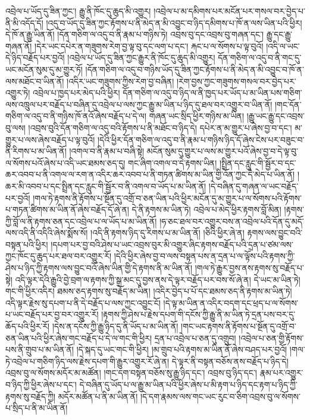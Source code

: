 འབྲེལ་པ་ཡོད་དུ་ཟིན་ཀྱང་། རྒྱུ་ནི་ཁོང་དུ་ཆུད་མི་འགྱུར། །འབྲེལ་པ་མ་དམིགས་པར་མངོན་པར་གསལ་བར་བྱེད་པ་ནི་མི་འདོད་དོ། །འདུ་བ་ཡོད་དུ་ཟིན་ཀྱང་རྟོགས་པ་ནི་མེད་ན་མི་འབྱུང་བ་ཉིད་དམིགས་པ་ཁོ་ན་ལས་ཡིན་པའི་ཕྱིར། དེ་ཁོ་ན་རྒྱུ་ཡིན་ནོ། །དོན་གཅིག་ལ་འདུ་བ་ནི་རྣམ་པ་གཉིས་ཏེ། འབྲས་བུ་དང་འབྲས་བུ་གཞན་དང་། རྒྱུ་དང་རྒྱུ་གཞན་ནོ། །དེར་ཡང་དཔེར་ན་གཟུགས་རེག་བྱ་ལྟ་བུ་དང་ལག་པ་དང་། རྐང་པ་ལ་སོགས་པ་ལྟ་བུའོ། །འདི་ལ་ཡང་དེ་ཉིད་བརྗོད་པར་བྱའོ། །འབྲེལ་པ་ཡོད་དུ་ཟིན་ཀྱང་རྒྱུར་ནི་ཁོང་དུ་ཆུད་མི་འགྱུར། དོན་གཅིག་ལ་འདུ་བ་ནི་གང་དུ་ཡང་མངོན་སུམ་དུ་མ་གྱུར་ཏོ། །དོན་གཅིག་ལ་འདུ་བ་གཉིས་ཡོད་དུ་ཟིན་ཀྱང་རྟོགས་པ་ནི་མེད་ན་མི་འབྱུང་བ་ཁོ་ན་ལས་མཐོང་བ་ཡིན་ནོ། །འདིར་ཡང་གཟུགས་ཀྱིས་རེག་བྱ་བཞིན། །རེག་བྱས་ཀྱང་གཟུགས་གསལ་བར་བྱེད་པར་འགྱུར་ཏེ། འབྲེལ་པ་ཁྱད་པར་མེད་པའི་ཕྱིར། དོན་གཅིག་ལ་འདུ་བ་ཉིད་ལ་ནི་ཁྱད་པར་ཡོད་པ་མ་ཡིན་པས་གཅིག་ལས་འཁྲུལ་པར་བརྗོད་པ་བཞིན་དུ་འབྲེལ་པ་ལས་ཀྱང་རྒྱུ་མ་ཡིན་པ་ཉིད་དུ་ཐལ་བར་འགྱུར་བ་ཡིན་ནོ། །གང་དོན་གཅིག་ལ་འདུ་བ་ནི་གཉིས་ཁོ་ནའོ་ཞེས་བརྗོད་པ་དེ་ལ། གཞན་ཡང་སྲིད་ཕྱིར་གཉིས་མ་ཡིན། །རྒྱུ་ཡང་རྒྱུ་དང་འབྲས་བུ་ལས། །འབྲས་བུའི་དོན་གཅིག་ལ་འདུ་བའི་རྟོགས་པ་ནི་མཐོང་བ་ཉིད་དེ། དཔེར་ན་མ་གྱུར་པ་ཞེས་བྱ་བ་དང་། མ་གྱུར་པ་ལས་ཞེས་བརྗོད་པ་ལྟ་བུའོ། །དེའི་ཕྱིར་དོན་གཅིག་ལ་འདུ་བ་ནི་རྣམ་པ་གཉིས་ཉིད་དོ་ཞེས་ངེས་པར་བཟུང་བ་ནི་རིགས་པ་མ་ཡིན་ནོ། །འགལ་བ་ནི་རྣམ་པ་བཞི་སྟེ། མངོན་སུམ་དུ་གྱུར་པ་ལས་མ་གྱུར་པའོ་ཞེས་བྱ་བ་དེ་ལྟ་བུ་ལ་སོགས་པའོ་ཞེས་པ་འདི་ཡང་ཐམས་ཅད་དུ། གང་ཞིག་འགལ་བ་དེ་རྟགས་ཡིན། །སྤྲིན་དང་རླུང་གི་སྦྱོར་བ་དང་ཆར་འབབ་པ་ནི་འགལ་ལ་རག་ན་འདིར་ཆར་འབབ་པ་ནི་གཏན་ཚིགས་མ་ཡིན་གྱི་འོན་ཀྱང་དེ་མེད་པ་ཡིན་ནོ། །ཆར་མི་འབབ་པ་དང་སྤྲིན་དང་རླུང་གི་སྦྱོར་བ་ནི་འགལ་བ་ཡོད་པ་མ་ཡིན་ནོ། །དེ་བཞིན་དུ་གཞན་ལ་ཡང་བརྗོད་པར་བྱའོ། །གལ་ཏེ་རྟགས་ནི་རྟོགས་པ་སྔོན་དུ་འགྲོ་བ་ཅན་ཡིན་པའི་ཕྱིར་མངོན་དུ་མ་གྱུར་པ་ལ་སོགས་པའི་རྟོགས་པ་གཏན་ཚིགས་མ་ཡིན་ནོ་ཞེས་བརྗོད་དོ་ཞེ་ན། དེ་ནི་རྟགས་མ་ཡིན་ཏེ། འབྲེལ་པ་མེད་ཕྱིར་རྟགས་བློ་མིན། །རྟགས་ཀྱི་བློ་ལ་ནི་རྟགས་ཅན་དང་འབྲེལ་པ་ལ་ཡོད་པ་མ་ཡིན་ནོ། །ཧ་ཅང་ཐལ་བར་འགྱུར་བས་ན་འབྲེལ་པའི་དོན་དུ་མདོ་ལས་འདི་ནི་འདིའི་ཞེས་སྨོས་སོ། །འདི་ནི་རྟགས་ཉིད་དུ་རིགས་པ་མ་ཡིན་ནོ། །ཅིའི་ཕྱིར་ཞེ་ན། རྟགས་ལས་བྱུང་བའི་བསྟན་པའི་ཕྱིར། །དཔག་པར་བྱ་བའི་ཤེས་པ་ཡང་འབྲས་བུར་མི་འགྱུར་ཞིང་རྟགས་བརྗོད་པའི་དྲན་པ་ཙམ་ལས་ཀྱང་ཁོང་དུ་ཆུད་པར་ཐལ་བར་འགྱུར་རོ། །དེའི་ཕྱིར་ཞེས་བྱ་བ་ལས་བསྟན་པས་ན་དྲན་པ་ལ་ལྟོས་པའི་རྟགས་ཀྱི་ཤེས་པ་ཉིད་ཀྱི་རྟགས་ལས་བྱུང་བའོ་ཞེས་ཡིན་གྱི་དེ་རྟགས་ནི་མ་ཡིན་ནོ། །གལ་ཏེ་རྒྱུར་བྱས་ནས་རྟགས་སུ་བརྗོད་པ་སྟེ། འདི་ལྟར་དེའི་རྒྱུའི་བྱེ་བྲག་ལ་རྟགས་ཀྱི་སྒྲ་མང་དུ་བྱས་ནས་དེ་ལྟར་བརྗོད་པར་བས་སོ་ཞེ་ན། དེ་ཡང་མ་ཡིན་ཏེ། གང་གི་ཕྱིར་འདིར། ཐམས་ཅད་རྟགས་སུ་བརྗོད་མ་ཡིན། །འདིར་བྱེད་པ་པོ་དང་ཐམས་ཅད་ནི་རྟགས་མ་ཡིན་ཏེ། འདི་ལྟར་རྗེས་སུ་དཔག་པ་ནི་དེ་བརྗོད་པ་ལས་ཀྱང་འབྱུང་ངོ། །དེ་ལྟ་མ་ཡིན་ན་འདིར་བདག་དང་ཕྲད་པ་ལ་སོགས་པ་ཡང་བརྗོད་པར་བྱ་བར་འགྱུར་རོ། །རྟགས་ཀྱི་ཤེས་པ་རྗེས་དཔག་གི་དངོས་ཀྱི་རྒྱུ་ནི་མ་ཡིན་ཏེ་དྲན་པས་བར་དུ་ཆོད་པའི་ཕྱིར་རོ། །དེས་ན་དངོས་ཀྱི་རྒྱུ་ཉིད་དུ་ནི་ཡོད་པ་མ་ཡིན་ནོ། །གང་ཡང་རྟགས་ནི་རྟོགས་པ་སྔོན་དུ་འགྲོ་བ་ཅན་ཡིན་པའི་ཕྱིར་ཞེས་གང་བརྗོད་པ་དེ་ལ་གང་གི་ཕྱིར། དྲན་པ་འབྲེལ་པ་ཅན་དུ་འགྲུབ། །འབྲེལ་པ་ཅན་གྱི་རྟོགས་པས་ནི་གྲུབ་པ་མ་ཡིན་ནོ། །དེ་སྐད་དུ་ཡང་གང་གི་ཕྱིར། །མ་གྲུབ་པའི་རྟགས་མ་ཡིན་ནོ་ཞེས་བཤད་པར་བྱའོ། །གལ་ཏེ་འབྲེལ་པ་གཅིག་ཉིད་ལས་རྗེས་དཔག་གི་རྒྱུར་འགྱུར་རོ་ཞེ་ན། དེ་ལྟར་ནི་བསྟན་བཅོས་ནས་བརྗོད་པ་ཉིད་དེ། འབྲས་བུ་ལ་སོགས་མདོར་མ་མཚོན། །གང་དག་བསྟན་བཅོས་སུ་རྒྱུ་ཉིད་དང་། འབྲས་བུ་ཉིད་དང་། རྣམ་པར་འགྱུར་བ་ཉིད་ཀྱི་ཕྱིར་ཞེས་པ་དང་། དེ་བཞིན་དུ་ཡོད་པ་ལ་རྒྱུ་མ་ཡིན་པའི་ཕྱིར་ཞེས་པ་མི་རྟག་པ་ཉིད་དང་རྟག་པ་ཉིད་ཀྱི་རྟགས་སུ་བརྗོད་ཀྱི། མདོར་མཚོན་པ་ནི་མ་ཡིན་ནོ། །དེ་དག་རྣམས་ལས་གང་ཡང་རུང་བ་ཅིག་འབྲས་བུ་ལ་སོགས་པ་སྲིད་པ་ནི་མ་ཡིན་ནོ། 